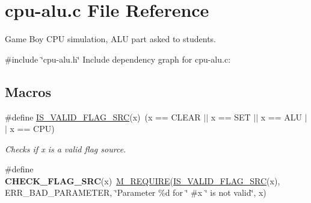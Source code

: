 \hypertarget{cpu-alu_8c}{}\section{cpu-\/alu.c File Reference}
\label{cpu-alu_8c}


Game Boy C\+PU simulation, A\+LU part asked to students.  


{\ttfamily \#include \char`\"{}cpu-\/alu.\+h\char`\"{}}\newline
Include dependency graph for cpu-\/alu.c\+:
\subsection*{Macros}
\begin{DoxyCompactItemize}
\item 
\mbox{\label{cpu-alu_8c_a317e6ad3371e3d8e5c3403e32e9d80b5}} 
\#define \hyperlink{cpu-alu_8c_a317e6ad3371e3d8e5c3403e32e9d80b5}{I\+S\+\_\+\+V\+A\+L\+I\+D\+\_\+\+F\+L\+A\+G\+\_\+\+S\+RC}(x)~(x == C\+L\+E\+AR $\vert$$\vert$ x == S\+ET $\vert$$\vert$ x == A\+LU $\vert$$\vert$ x == C\+PU)
\begin{DoxyCompactList}\small\item\em Checks if x is a valid flag source. \end{DoxyCompactList}\item 
\mbox{\label{cpu-alu_8c_a1850c8ec5243fcb17417f3318acbc4e3}} 
\#define {\bfseries C\+H\+E\+C\+K\+\_\+\+F\+L\+A\+G\+\_\+\+S\+RC}(x)~\hyperlink{error_8h_a83c518271b7028053a924a3cff9e5e58}{M\+\_\+\+R\+E\+Q\+U\+I\+RE}(\hyperlink{cpu-alu_8c_a317e6ad3371e3d8e5c3403e32e9d80b5}{I\+S\+\_\+\+V\+A\+L\+I\+D\+\_\+\+F\+L\+A\+G\+\_\+\+S\+RC}(x), E\+R\+R\+\_\+\+B\+A\+D\+\_\+\+P\+A\+R\+A\+M\+E\+T\+ER, \char`\"{}Parameter \%d for \char`\"{} \#x \char`\"{} is not valid\char`\"{}, x)
\end{DoxyCompactItemize}
